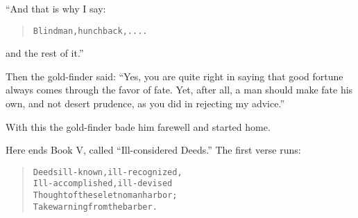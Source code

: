 \documentclass[article, twoside, 10pt]{memoir}
\renewenvironment{verbatim}{%
\begin{quote}%
\vskip -10pt%
\begin{alltt}\normalfont\small}{\end{alltt}%
\end{quote}%
\vskip -10pt
} %
\begin{document}
“And that is why I say:

\begin{verbatim}
Blind man, hunchback, . . . .
\end{verbatim}
and the rest of it.”

Then the gold-finder said:
``Yes, you are quite right in saying that good fortune always comes through the favor of fate. Yet, after all, a man should make fate his own, and not desert prudence, as you did in rejecting my advice.''

With this the gold-finder bade him farewell and started home.

Here ends Book V, called ``Ill-considered Deeds.'' The first verse
runs:

\begin{verbatim}
Deeds ill-known, ill-recognized,
Ill-accomplished, ill-devised{\textemdash}
Thought of these let no man harbor;
Take warning from the barber.
\end{verbatim}
\end{document}

